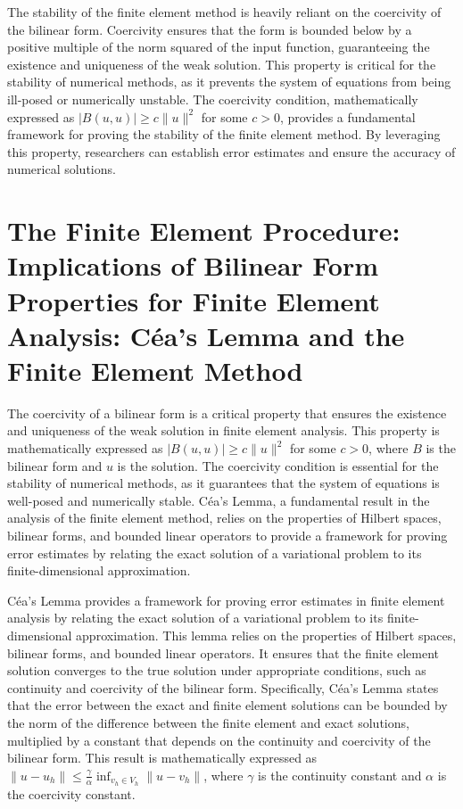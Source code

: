 \documentclass[12pt, a4paper]{article}
\begin{document}
The stability of the finite element method is heavily reliant on the coercivity of the bilinear form. Coercivity ensures that the form is bounded below by a positive multiple of the norm squared of the input function, guaranteeing the existence and uniqueness of the weak solution. This property is critical for the stability of numerical methods, as it prevents the system of equations from being ill-posed or numerically unstable. The coercivity condition, mathematically expressed as \(|B(u, u)| \geq c\|u\|^2\) for some \(c > 0\), provides a fundamental framework for proving the stability of the finite element method. By leveraging this property, researchers can establish error estimates and ensure the accuracy of numerical solutions.

\section{The Finite Element Procedure: Implications of Bilinear Form Properties for Finite Element Analysis: Céa's Lemma and the Finite Element Method}
\label{sec:9baf6a07-bf62-4890-a48b-4da300767ddf}

The coercivity of a bilinear form is a critical property that ensures the existence and uniqueness of the weak solution in finite element analysis. This property is mathematically expressed as \(|B(u, u)| \geq c\|u\|^2\) for some \(c > 0\), where \(B\) is the bilinear form and \(u\) is the solution. The coercivity condition is essential for the stability of numerical methods, as it guarantees that the system of equations is well-posed and numerically stable. Céa's Lemma, a fundamental result in the analysis of the finite element method, relies on the properties of Hilbert spaces, bilinear forms, and bounded linear operators to provide a framework for proving error estimates by relating the exact solution of a variational problem to its finite-dimensional approximation.

Céa's Lemma provides a framework for proving error estimates in finite element analysis by relating the exact solution of a variational problem to its finite-dimensional approximation. This lemma relies on the properties of Hilbert spaces, bilinear forms, and bounded linear operators. It ensures that the finite element solution converges to the true solution under appropriate conditions, such as continuity and coercivity of the bilinear form. Specifically, Céa's Lemma states that the error between the exact and finite element solutions can be bounded by the norm of the difference between the finite element and exact solutions, multiplied by a constant that depends on the continuity and coercivity of the bilinear form. This result is mathematically expressed as \(\|u - u_h\| \leq \frac{\gamma}{\alpha} \inf_{v_h \in V_h} \|u - v_h\|\), where \(\gamma\) is the continuity constant and \(\alpha\) is the coercivity constant.
\end{document}
